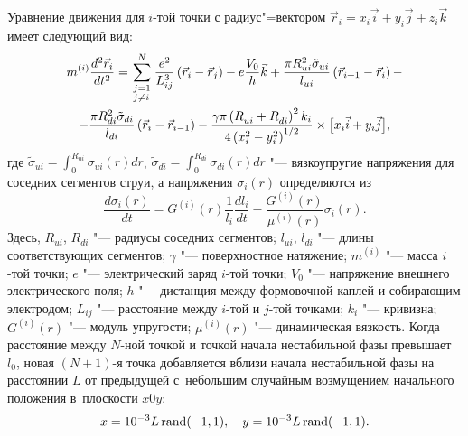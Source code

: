 Уравнение движения для $i$-той точки с радиус"=вектором 
$\vec{r} _i  = x_i \vec{
 i}  + y_i \vec{
 j}  + z_i \vec{
 k}$  имеет следующий вид:
\begin{multline}
 m^{(i)} \frac{{d^2 \vec{
 r} _i }}{{dt^2 }} = \sum\limits^N_{\scriptstyle j = 1 \hfill \atop
  \scriptstyle j \ne i \hfill} {\frac{{e^2 }}{{L_{ij}^3 }}\left( {\vec{
 r} _i  - \vec{
 r} _j } \right) - e\frac{{V_0 }}{h}} \vec k + \frac{{\pi R_{ui}^2 \tilde \sigma _{ui} }}{{l_{ui} }}\left( {\vec{
 r} _{i + 1}  - \vec{
 r} _i } \right) -  \\
  - \frac{{\pi R_{di}^2 \tilde \sigma _{di} }}{{l_{di} }}\left( {\vec{
 r} _i  - \vec{
 r} _{i - 1} } \right) - \frac{{\gamma \pi \left( {R_{ui}^{}  + R_{di}^{} } \right)^2 k_i }}{{4\left( {x_i^2  - y_i^2 } \right)^{{1 \mathord{\left/
 {\vphantom {1 2}} \right.
 \kern-\nulldelimiterspace} 2}} }} \times \bigl[ x_i \vec i + y_i \vec{
 j}  \bigr], 
 \label{uravnenie1}
\end{multline}
где
$\displaystyle \tilde \sigma _{ui}  = \int_0^{R_{ui} } {\sigma _{ui} (r)dr}$, 
$\displaystyle \tilde \sigma _{di}  = \int_0^{R_{di} } {\sigma _{di} (r)dr}
$
"--- вязкоупругие напряжения для соседних сегментов струи, а напряжения $\sigma _i (r)$ определяются из
\begin{equation}
\frac{{d\sigma _i (r)}}{{dt}} = G^{(i)} (r)\frac{1}{{l_i }}\frac{{dl_i }}{{dt}} - \frac{{G^{(i)} (r)}}{{\mu ^{(i)} (r)}}\sigma _i (r).
\label{uravnenie2}
\end{equation}
Здесь, $R_{ui}$, $R_{di}$ "--- радиусы соседних сегментов; 
$l_{ui}$, $l_{di}$ "--- длины соответствующих сегментов; 
$\gamma$ "--- поверхностное натяжение; 
$m^{(i)}$ "--- масса $i$-той точки;
$e$ "--- электрический заряд $i$-той точки;
$V_0$ "--- напряжение внешнего электрического поля;
$h$ "--- дистанция между формовочной каплей и собирающим электродом;
$L_{ij}$ "--- расстояние между $i$-той и $j$-той точками;
$k_i$ "--- кривизна; 
$G^{(i)} (r)$ "--- модуль упругости; 
$\mu ^{(i)} (r)$ "--- динамическая вязкость. 
Когда расстояние между $N$-ной точкой и точкой начала нестабильной фазы превышает~$l_0$,  новая $(N+1)$-я точка добавляется вблизи начала нестабильной фазы на расстоянии $L$ от предыдущей с~небольшим случайным возмущением начального положения в~плоскости $x0y$:
$$
 x = 10^{ - 3} L \, {\rm rand}(- 1, 1), \quad  y = 10^{ - 3} L \, {\rm rand}(- 1, 1).$$



